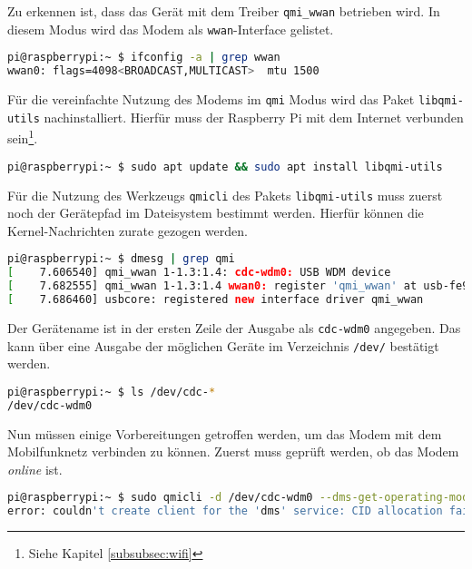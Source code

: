 \noindent Zu erkennen ist, dass das Gerät mit dem Treiber \texttt{qmi\_wwan} betrieben wird.
In diesem Modus wird das Modem als \texttt{wwan}-Interface gelistet.

\begin{lstlisting}[language=Bash]
pi@raspberrypi:~ $ ifconfig -a | grep wwan
wwan0: flags=4098<BROADCAST,MULTICAST>  mtu 1500
\end{lstlisting}

\noindent Für die vereinfachte Nutzung des Modems im \texttt{qmi} Modus wird das Paket \texttt{libqmi-utils} nachinstalliert.
Hierfür muss der Raspberry Pi mit dem Internet verbunden sein\footnote{Siehe Kapitel \ref{subsubsec:wifi}}.

\begin{lstlisting}[language=Bash]
pi@raspberrypi:~ $ sudo apt update && sudo apt install libqmi-utils
\end{lstlisting}

\noindent Für die Nutzung des Werkzeugs \texttt{qmicli} des Pakets \texttt{libqmi-utils} muss zuerst noch der Gerätepfad im
Dateisystem bestimmt werden.
Hierfür können die Kernel-Nachrichten zurate gezogen werden.

\begin{lstlisting}[language=Bash]
pi@raspberrypi:~ $ dmesg | grep qmi
[    7.606540] qmi_wwan 1-1.3:1.4: cdc-wdm0: USB WDM device
[    7.682555] qmi_wwan 1-1.3:1.4 wwan0: register 'qmi_wwan' at usb-fe980000.usb-1.3, WWAN/QMI device, 8e:c2:07:55:9c:c3
[    7.686460] usbcore: registered new interface driver qmi_wwan
\end{lstlisting}

\noindent Der Gerätename ist in der ersten Zeile der Ausgabe als \texttt{cdc-wdm0} angegeben.
Das kann über eine Ausgabe der möglichen Geräte im Verzeichnis \texttt{/dev/} bestätigt werden.

\begin{lstlisting}[language=Bash]
pi@raspberrypi:~ $ ls /dev/cdc-*
/dev/cdc-wdm0
\end{lstlisting}



Nun müssen einige Vorbereitungen getroffen werden, um das Modem mit dem Mobilfunknetz verbinden zu können.
Zuerst muss geprüft werden, ob das Modem \emph{online} ist.

\begin{lstlisting}[language=Bash]
pi@raspberrypi:~ $ sudo qmicli -d /dev/cdc-wdm0 --dms-get-operating-mode
error: couldn't create client for the 'dms' service: CID allocation failed in the CTL client: Transaction timed out
\end{lstlisting}

